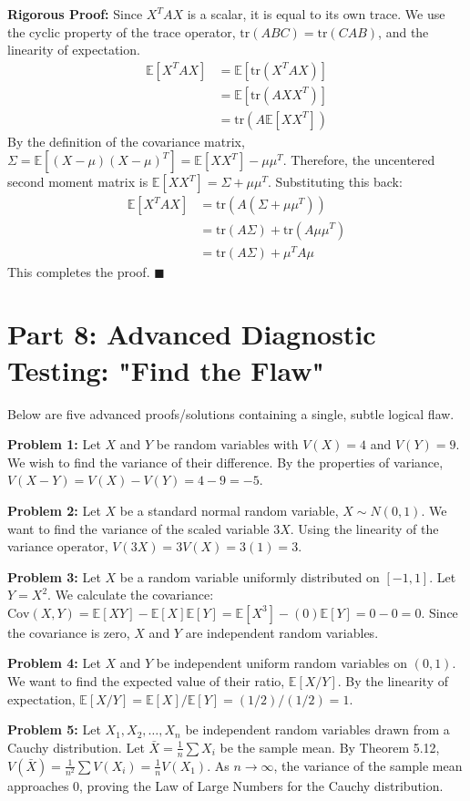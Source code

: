 \documentclass[11pt, a4paper]{article}
\theoremstyle{definition}
\theoremstyle{remark}
\newcommand{\E}{\mathbb{E}}
\begin{document}
\textbf{Rigorous Proof:}
Since $X^T A X$ is a scalar, it is equal to its own trace. We use the cyclic property of the trace operator, $\text{tr}(ABC) = \text{tr}(CAB)$, and the linearity of expectation.
\begin{align*}
\E[X^T A X] &= \E[\text{tr}(X^T A X)] \\
&= \E[\text{tr}(A X X^T)] \\
&= \text{tr}(A \E[X X^T])
\end{align*}
By the definition of the covariance matrix, $\Sigma = \E[(X-\mu)(X-\mu)^T] = \E[X X^T] - \mu \mu^T$.
Therefore, the uncentered second moment matrix is $\E[X X^T] = \Sigma + \mu \mu^T$.
Substituting this back:
\begin{align*}
\E[X^T A X] &= \text{tr}(A (\Sigma + \mu \mu^T)) \\
&= \text{tr}(A \Sigma) + \text{tr}(A \mu \mu^T) \\
&= \text{tr}(A \Sigma) + \mu^T A \mu
\end{align*}
This completes the proof. $\blacksquare$

\newpage
\section{Part 8: Advanced Diagnostic Testing: "Find the Flaw"}

Below are five advanced proofs/solutions containing a single, subtle logical flaw. 

\textbf{Problem 1:} Let $X$ and $Y$ be random variables with $V(X)=4$ and $V(Y)=9$. We wish to find the variance of their difference. By the properties of variance, $V(X-Y) = V(X) - V(Y) = 4 - 9 = -5$.

\textbf{Problem 2:} Let $X$ be a standard normal random variable, $X \sim N(0,1)$. We want to find the variance of the scaled variable $3X$. Using the linearity of the variance operator, $V(3X) = 3V(X) = 3(1) = 3$.

\textbf{Problem 3:} Let $X$ be a random variable uniformly distributed on $[-1, 1]$. Let $Y = X^2$. We calculate the covariance: $\text{Cov}(X,Y) = \E[XY] - \E[X]\E[Y] = \E[X^3] - (0)\E[Y] = 0 - 0 = 0$. Since the covariance is zero, $X$ and $Y$ are independent random variables.

\textbf{Problem 4:} Let $X$ and $Y$ be independent uniform random variables on $(0,1)$. We want to find the expected value of their ratio, $\E[X/Y]$. By the linearity of expectation, $\E[X/Y] = \E[X] / \E[Y] = (1/2) / (1/2) = 1$.

\textbf{Problem 5:} Let $X_1, X_2, \dots, X_n$ be independent random variables drawn from a Cauchy distribution. Let $\bar{X} = \frac{1}{n}\sum X_i$ be the sample mean. By Theorem 5.12, $V(\bar{X}) = \frac{1}{n^2} \sum V(X_i) = \frac{1}{n} V(X_1)$. As $n \to \infty$, the variance of the sample mean approaches 0, proving the Law of Large Numbers for the Cauchy distribution.
\end{document}

